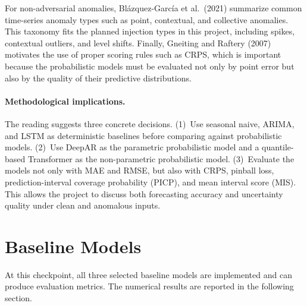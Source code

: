 \documentclass[11pt,a4paper]{article}
\begin{document}
For non-adversarial anomalies, Blázquez-García et al.\ (2021) summarize common
time-series anomaly types such as point, contextual, and collective anomalies.
This taxonomy fits the planned injection types in this project, including
spikes, contextual outliers, and level shifts. Finally, Gneiting and Raftery
(2007) motivates the use of proper scoring rules such as CRPS, which is
important because the probabilistic models must be evaluated not only by point
error but also by the quality of their predictive distributions.

\paragraph{Methodological implications.}
The reading suggests three concrete decisions. (1)~Use seasonal naive, ARIMA,
and LSTM as deterministic baselines before comparing against probabilistic
models. (2)~Use DeepAR as the parametric probabilistic model and a
quantile-based Transformer as the non-parametric probabilistic model.
(3)~Evaluate the models not only with MAE and RMSE, but also with CRPS,
pinball loss, prediction-interval coverage probability (PICP), and mean
interval score (MIS). This allows the project to discuss both forecasting
accuracy and uncertainty quality under clean and anomalous inputs.

\section{Baseline Models}

At this checkpoint, all three selected baseline models are implemented
and can produce evaluation metrics. The numerical results are reported
in the following section.
\end{document}
